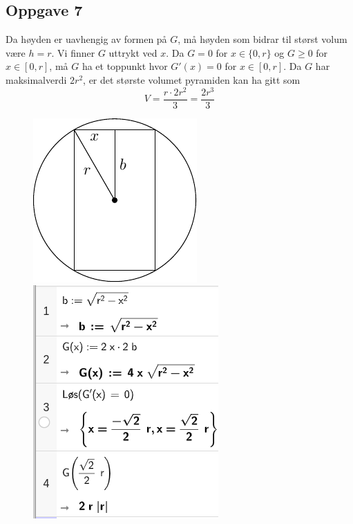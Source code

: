 \subsection*{Oppgave 7}
Da høyden er uavhengig av formen på $ G $, må høyden som bidrar til størst volum være $ h=r $. Vi finner $ G $ uttrykt ved $ x $. Da $ G=0 $ for $ x\in\lbrace0, r\rbrace $ og $ G\geq0 $ for $ x\in[0, r] $, må $ G $ ha et toppunkt hvor $ G'(x)=0 $ for $ x\in[0, r] $. Da $ G $ har maksimalverdi $ 2r^2 $, er det største volumet pyramiden kan ha gitt som
\[ V=\frac{r\cdot2r^2}{3}=\frac{2r^3}{3} \]
\begin{figure}
	\centering
	\includegraphics{opg7}\quad
	\includegraphics[scale=0.5]{opg7a}
\end{figure}
